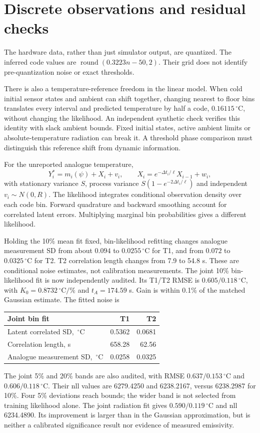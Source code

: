 \documentclass[10pt,letterpaper]{article}
\newcommand{\C}{\,^\circ\mathrm{C}}
\begin{document}
\section{Discrete observations and residual checks}
The hardware data, rather than just simulator output, are quantized. The
inferred code values are $\operatorname{round}(0.3223n-50,2)$.
Their grid does not identify pre-quantization noise or exact thresholds.

There is also a temperature-reference freedom in the linear model. When cold
initial sensor states and ambient can shift together, changing nearest to floor
bins translates every interval and predicted temperature by half a code,
$0.16115\C$, without changing the likelihood. An independent synthetic check
verifies this identity with slack ambient bounds. Fixed initial states, active
ambient limits or absolute-temperature radiation can break it. A threshold
phase comparison must distinguish this reference shift from dynamic information.

For the unreported analogue temperature,
\[
 Y_i^*=m_i(\psi)+X_i+v_i,\qquad
 X_i=e^{-\Delta t_i/\ell}X_{i-1}+w_i,
\]
with stationary variance $S$, process variance
$S(1-e^{-2\Delta t_i/\ell})$ and independent $v_i\sim N(0,R)$.
The likelihood integrates conditional observation density over each code
bin. Forward quadrature and backward smoothing account for correlated latent
errors. Multiplying marginal bin probabilities gives a different likelihood.

Holding the 10\% mean fit fixed, bin-likelihood refitting changes analogue
measurement SD from about $0.094$ to $0.0255\C$ for T1, and from $0.072$ to
$0.0325\C$ for T2. T2 correlation length changes from 7.9 to 54.8 s.
These are conditional noise estimates, not calibration measurements.
The joint 10\% bin-likelihood fit is now independently audited. Its T1/T2 RMSE
is $0.605/0.118\C$, with $K_0=0.8732\C/\%$ and $t_A=174.59$ s. Gain is
within 0.1\% of the matched Gaussian estimate. The fitted noise is
\begin{center}
\begin{tabular}{@{}lrr@{}}
\toprule
Joint bin fit & T1 & T2\\
\midrule
Latent correlated SD, $\C$ & 0.5362 & 0.0681\\
Correlation length, s & 658.28 & 62.56\\
Analogue measurement SD, $\C$ & 0.0258 & 0.0325\\
\bottomrule
\end{tabular}
\end{center}
The joint 5\% and 20\% bands are also audited, with RMSE
$0.637/0.153\C$ and $0.606/0.118\C$. Their nll values are 6279.4250 and
6238.2167, versus 6238.2987 for 10\%. Four 5\% deviations reach bounds;
the wider band is not selected from training likelihood alone.
The joint radiation fit gives $0.590/0.119\C$ and nll 6234.4890.
Its improvement is larger than in the Gaussian approximation, but is neither
a calibrated significance result nor evidence of measured emissivity.
\end{document}
